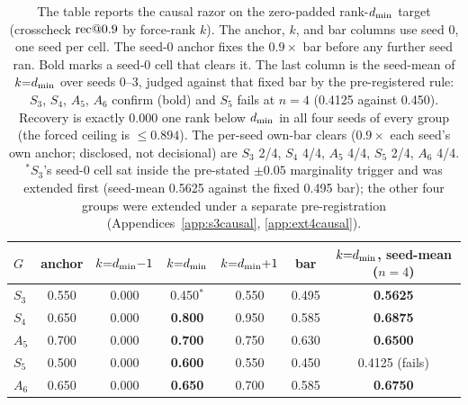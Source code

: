 \begin{table}[t]
\centering
\footnotesize
\setlength{\tabcolsep}{5pt}
\begin{tabular}{lcccccc}
\toprule
$G$ & anchor & $k{=}d_{\min}{-}1$ & $k{=}d_{\min}$ & $k{=}d_{\min}{+}1$ & bar & $k{=}d_{\min}$, seed-mean ($n{=}4$) \\
\midrule
$S_3$ & 0.550 & 0.000 & 0.450$^{\ast}$ & 0.550 & 0.495 & \textbf{0.5625} \\
$S_4$ & 0.650 & 0.000 & \textbf{0.800} & 0.950 & 0.585 & \textbf{0.6875} \\
$A_5$ & 0.700 & 0.000 & \textbf{0.700} & 0.750 & 0.630 & \textbf{0.6500} \\
$S_5$ & 0.500 & 0.000 & \textbf{0.600} & 0.550 & 0.450 & 0.4125 (fails) \\
$A_6$ & 0.650 & 0.000 & \textbf{0.650} & 0.700 & 0.585 & \textbf{0.6750} \\
\bottomrule
\end{tabular}
\caption{The table reports the causal razor on the zero-padded rank-$d_{\min}$ target
(crosscheck $\mathrm{rec}@0.9$ by force-rank $k$). The anchor, $k$, and bar
columns use seed 0, one seed per cell. The seed-0 anchor fixes the
$0.9\times$ bar before any further seed ran. Bold marks a seed-0 cell that
clears it. The last column is the seed-mean of
$k{=}d_{\min}$ over seeds 0--3, judged against that fixed bar by the
pre-registered rule: $S_3$, $S_4$, $A_5$, $A_6$ confirm (bold) and
$S_5$ fails at $n = 4$ (0.4125 against 0.450). Recovery is exactly 0.000
one rank below $d_{\min}$ in all four seeds of every group (the forced
ceiling is $\le 0.894$). The per-seed own-bar clears ($0.9\times$ each
seed's own anchor; disclosed, not decisional) are $S_3$ 2/4, $S_4$ 4/4,
$A_5$ 4/4, $S_5$ 2/4, $A_6$ 4/4.
$^{\ast}$$S_3$'s seed-0 cell sat inside the pre-stated $\pm 0.05$
marginality trigger and was extended first (seed-mean 0.5625 against
the fixed 0.495 bar); the other four groups were extended under a
separate pre-registration (Appendices~\ref{app:s3causal},
\ref{app:ext4causal}).}
\label{tab:razor}
\end{table}

